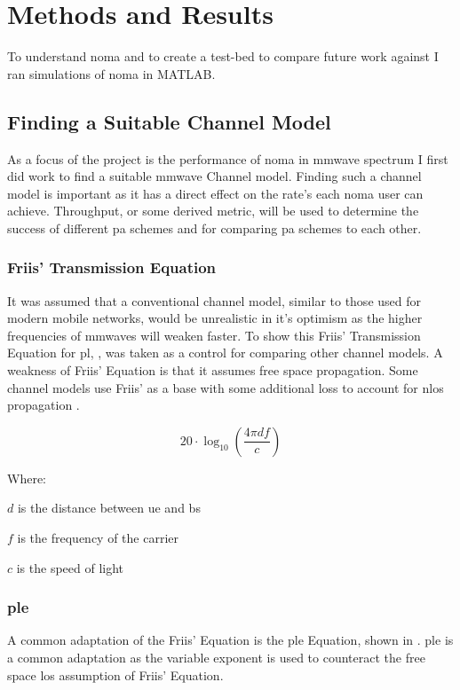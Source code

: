 \chapter{Methods and Results}
\label{chap:mar}
To understand \ac{noma} and to create a test-bed to compare future work against I ran simulations of \ac{noma} in MATLAB.

\section{Finding a Suitable Channel Model}
\label{sec:ch}
As a focus of the project is the performance of \ac{noma} in \ac{mmwave} spectrum I first did work to find a suitable \ac{mmwave} Channel model.
Finding such a channel model is important as it has a direct effect on the rate's each \ac{noma} user can achieve.
Throughput, or some derived metric, will be used to determine the success of different \ac{pa} schemes and for comparing \ac{pa} schemes to each other.

\subsection{Friis' Transmission Equation}
It was assumed that a conventional channel model, similar to those used for modern mobile networks, would be unrealistic in it's optimism as the higher frequencies of \acp{mmwave} will weaken faster.
To show this Friis' Transmission Equation for \ac{pl}, , was taken as a control for comparing other channel models.
A weakness of Friis' Equation is that it assumes free space propagation.
Some channel models use Friis' as a base with some additional loss to account for \ac{nlos} propagation \cite{khan:2011}.

\begin{equation}
	20 \cdot \log_{10} \left( \frac{4 \pi d f}{c} \right)
	\label{eq:friis}
\end{equation}

\par
Where:
\par \indent $d$ is the distance between \ac{ue} and \ac{bs}
\par \indent $f$ is the frequency of the carrier
\par \indent $c$ is the speed of light
\par

\subsection{\acl{ple}}
A common adaptation of the Friis' Equation is the \ac{ple} Equation, shown in .
\ac{ple} is a common adaptation as the variable exponent is used to counteract the free space \ac{los} assumption of Friis' Equation.

